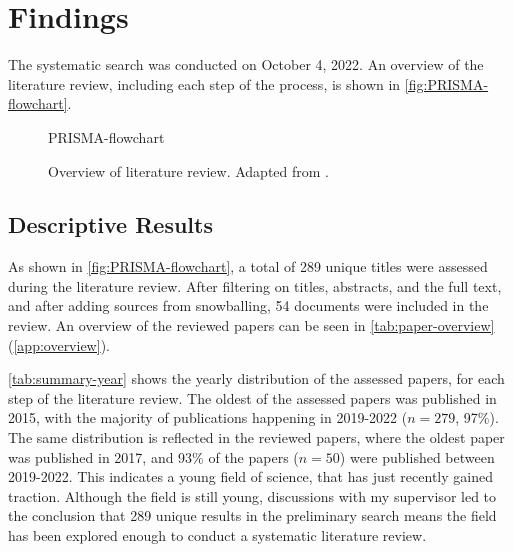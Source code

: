 \section{Findings}
\label{sec:Results}
The systematic search was conducted on October 4, 2022. An overview of the literature review, including each step of the process, is shown in \autoref{fig:PRISMA-flowchart}.


\begin{figure}[p]
    \centering
    {PRISMA-flowchart}
    \caption[Overview of literature review]{Overview of literature review. Adapted from \textcite{PRISMA_2022}.}
    \label{fig:PRISMA-flowchart}
\end{figure}


\subsection{Descriptive Results} %
As shown in \autoref{fig:PRISMA-flowchart}, a total of 289 unique titles were assessed during the literature review. After filtering on titles, abstracts, and the full text, and after adding sources from snowballing, 54 documents were included in the review. An overview of the reviewed papers can be seen in \autoref{tab:paper-overview} (\autoref{app:overview}).

\autoref{tab:summary-year} shows the yearly distribution of the assessed papers, for each step of the literature review. The oldest of the assessed papers was published in 2015, with the majority of publications happening in 2019-2022 ($n = 279$, 97\%). The same distribution is reflected in the reviewed papers, where the oldest paper was published in 2017, and 93\% of the papers ($n = 50$) were published between 2019-2022. This indicates a young field of science, that has just recently gained traction. Although the field is still young, discussions with my supervisor led to the conclusion that 289 unique results in the preliminary search means the field has been explored enough to conduct a systematic literature review.


